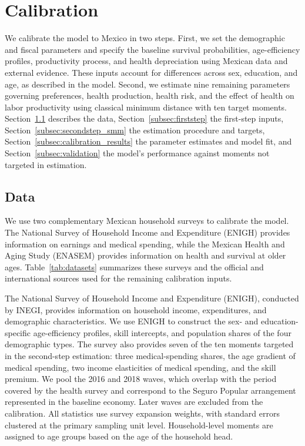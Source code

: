 \documentclass[12pt,a4paper]{article}
\begin{document}
\section{Calibration}
\label{sec:calibration}

We calibrate the model to Mexico in two steps. First, we set the demographic and fiscal parameters and specify the baseline survival probabilities, age-efficiency profiles, productivity process, and health depreciation using Mexican data and external evidence. These inputs account for differences across sex, education, and age, as described in the model. Second, we estimate nine remaining parameters governing preferences, health production, health risk, and the effect of health on labor productivity using classical minimum distance with ten target moments. Section~\ref{subsec:data} describes the data, Section~\ref{subsec:firststep} the first-step inputs, Section~\ref{subsec:secondstep_smm} the estimation procedure and targets, Section~\ref{subsec:calibration_results} the parameter estimates and model fit, and Section~\ref{subsec:validation} the model's performance against moments not targeted in estimation.


\subsection{Data}
\label{subsec:data}

We use two complementary Mexican household surveys to calibrate the model. The National Survey of Household Income and Expenditure (ENIGH) provides information on earnings and medical spending, while the Mexican Health and Aging Study (ENASEM) provides information on health and survival at older ages. Table~\ref{tab:datasets} summarizes these surveys and the official and international sources used for the remaining calibration inputs.

The National Survey of Household Income and Expenditure (ENIGH), conducted by INEGI, provides information on household income, expenditures, and demographic characteristics. We use ENIGH to construct the sex- and education-specific age-efficiency profiles, skill intercepts, and population shares of the four demographic types. The survey also provides seven of the ten moments targeted in the second-step estimation: three medical-spending shares, the age gradient of medical spending, two income elasticities of medical spending, and the skill premium. We pool the 2016 and 2018 waves, which overlap with the period covered by the health survey and correspond to the Seguro Popular arrangement represented in the baseline economy. Later waves are excluded from the calibration. All statistics use survey expansion weights, with standard errors clustered at the primary sampling unit level. Household-level moments are assigned to age groups based on the age of the household head.
\end{document}
